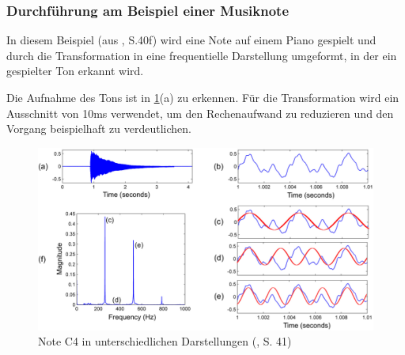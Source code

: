 



\par

\subsubsection{Durchführung am Beispiel einer Musiknote}

In diesem Beispiel (aus \cite{fundamentals_of_music_processing}, S.40f) wird eine Note auf einem Piano gespielt und durch die Transformation in eine frequentielle Darstellung umgeformt, in der ein gespielter Ton erkannt wird.

\par


Die Aufnahme des Tons ist in \cref{fig:fourier}(a) zu erkennen. Für die Transformation wird ein Ausschnitt von 10ms verwendet, um den Rechenaufwand zu reduzieren und den Vorgang beispielhaft zu verdeutlichen.

%
\begin{figure}[h]
    \includegraphics[width=1\textwidth]{images/Fourier_math.PNG}
    \caption{Note C4 in unterschiedlichen Darstellungen (\cite{fundamentals_of_music_processing}, S. 41)}
    \label{fig:fourier}
    \end{figure}
\par


